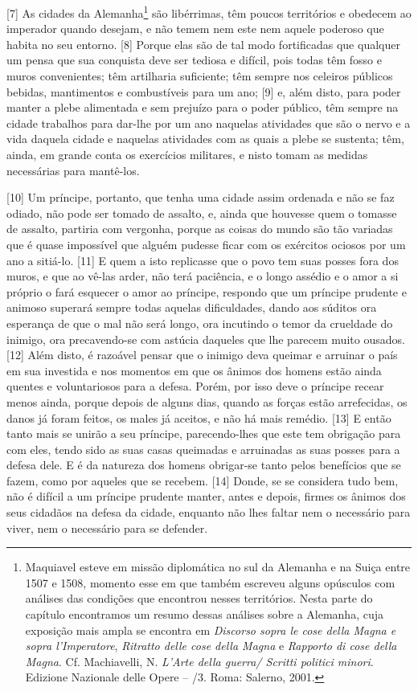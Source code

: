 {[}7{]} As cidades da Alemanha\footnote{Maquiavel esteve em missão
  diplomática no sul da Alemanha e na Suiça entre 1507 e 1508, momento
  esse em que também escreveu alguns opúsculos com análises das
  condições que encontrou nesses territórios. Nesta parte do capítulo
  encontramos um resumo dessas análises sobre a Alemanha, cuja exposição
  mais ampla se encontra em \emph{Discorso sopra le cose della Magna e
  sopra l'Imperatore}, \emph{Ritratto delle cose della Magna} e
  \emph{Rapporto di cose della Magna}. Cf. Machiavelli, N. \emph{L'Arte
  della guerra/ Scritti politici minori}. Edizione Nazionale delle Opere
  -- /3. Roma: Salerno, 2001.} são libérrimas, têm poucos territórios e
obedecem ao imperador quando desejam, e não temem nem este nem aquele
poderoso que habita no seu entorno. {[}8{]} Porque elas são de tal modo
fortificadas que qualquer um pensa que sua conquista deve ser tediosa e
difícil, pois todas têm fosso e muros convenientes; têm artilharia
suficiente; têm sempre nos celeiros públicos bebidas, mantimentos e
combustíveis para um ano; {[}9{]} e, além disto, para poder manter a
plebe alimentada e sem prejuízo para o poder público, têm sempre na
cidade trabalhos para dar-lhe por um ano naquelas atividades que são o
nervo e a vida daquela cidade e naquelas atividades com as quais a plebe
se sustenta; têm, ainda, em grande conta os exercícios militares, e
nisto tomam as medidas necessárias para mantê-los.

{[}10{]} Um príncipe, portanto, que tenha uma cidade assim ordenada e
não se faz odiado, não pode ser tomado de assalto, e, ainda que houvesse
quem o tomasse de assalto, partiria com vergonha, porque as coisas do
mundo são tão variadas que é quase impossível que alguém pudesse ficar
com os exércitos ociosos por um ano a sitiá-lo. {[}11{]} E quem a isto
replicasse que o povo tem suas posses fora dos muros, e que ao vê-las
arder, não terá paciência, e o longo assédio e o amor a si próprio o
fará esquecer o amor ao príncipe, respondo que um príncipe prudente e
animoso superará sempre todas aquelas dificuldades, dando aos súditos
ora esperança de que o mal não será longo, ora incutindo o temor da
crueldade do inimigo, ora precavendo-se com astúcia daqueles que lhe
parecem muito ousados. {[}12{]} Além disto, é razoável pensar que o
inimigo deva queimar e arruinar o país em sua investida e nos momentos
em que os ânimos dos homens estão ainda quentes e voluntariosos para a
defesa. Porém, por isso deve o príncipe recear menos ainda, porque
depois de alguns dias, quando as forças estão arrefecidas, os danos já
foram feitos, os males já aceitos, e não há mais remédio. {[}13{]} E
então tanto mais se unirão a seu príncipe, parecendo-lhes que este tem
obrigação para com eles, tendo sido as suas casas queimadas e arruinadas
as suas posses para a defesa dele. E é da natureza dos homens obrigar-se
tanto pelos benefícios que se fazem, como por aqueles que se recebem.
{[}14{]} Donde, se se considera tudo bem, não é difícil a um príncipe
prudente manter, antes e depois, firmes os ânimos dos seus cidadãos na
defesa da cidade, enquanto não lhes faltar nem o necessário para viver,
nem o necessário para se defender.

